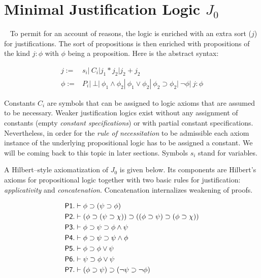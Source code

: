\section{Minimal Justification Logic $J_0$}~\label{min:jo}
To permit for an account of reasons, the logic is enriched with an extra sort ($j$) for justifications. The sort of propositions is then enriched with propositions of the kind $j:\phi$ with $\phi$ being a proposition. Here is the abstract syntax:

\begin{mdframed}
\begin{align*}
j := &s_i|\ C_i| j_1*j_2| j_2 + j_2\\
 \phi:=& P_i|\ \bot|\ \phi_1\wedge\phi_2|\ \phi_1\vee\phi_2| \ \phi_2\supset\phi_2|\ \neg\phi|\ j:\phi   
\end{align*}
\end{mdframed}
Constants $C_i$ are symbols that can be assigned to logic axioms that are assumed to be necessary. Weaker justification logics exist without any assignment of constants (empty \emph{constant specifications}) or with partial constant specifications. Nevertheless, in order for the  \emph{rule of necessitation} to be admissible each axiom instance of the underlying propositional logic has to be assigned a constant. We will be coming back to this topic in later sections. Symbols $s_i$ stand for variables.

A Hilbert--style axiomatization of $J_0$ is given below. Its components are Hilbert's axioms for propositional logic together with two basic rules for justification: \emph{applicativity} and \emph{concatenation}. 
Concatenation internalizes weakening of proofs.
\begin{mdframed}
\begin{align*}
&\sf{P1}.  \vdash \phi\supset(\psi\supset\phi)\\
& \sf{P2}. \vdash (\phi\supset(\psi\supset\chi))\supset((\phi\supset\psi)\supset(\phi\supset\chi))\\
& \sf{P3}. \vdash \phi\supset\psi\supset\phi\wedge\psi\\
&\sf{P4}. \vdash \phi\supset\psi\supset\psi\wedge\phi\\
&\sf{P5}.  \vdash \phi\supset\phi\vee\psi\\
&\sf{P6}. \vdash \psi\supset\phi\vee\psi\\
&\sf{P7}. \vdash (\phi\supset\psi)\supset(\neg\psi\supset\neg\phi)\\
\end{align*}
\end{mdframed}


